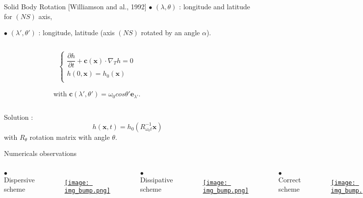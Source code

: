 \documentclass[11pt]{beamer}
\begin{document}
\begin{frame}{Solid Body Rotation [Williamson and al., 1992]}
$\bullet$ $(\lambda, \theta)$ : longitude and latitude for $(NS)$ axis,

$\bullet$ $(\lambda', \theta')$ : longitude, latitude (axis $(NS)$ rotated by an angle $\alpha$).

\begin{columns}
\begin{figure}
\def\svgwidth{0.6 \textwidth}
\vspace{0.5cm}

\end{figure}
\begin{block}{}
\begin{equation*}
\left \{
\begin{array}{l}
\dfrac{\partial h}{\partial t} + \mathbf{c} \left( \mathbf{x} \right) \cdot \nabla_T h = 0\\[6pt]
h(0,\mathbf{x}) = h_0(\mathbf{x})\\
\end{array}
\right.
\end{equation*}

with $\mathbf{c} \left( \lambda', \theta' \right) = \omega_0  cos \theta' \mathbf{e}_{\lambda'}$.
\end{block}
\end{columns}

\begin{block}{}
Solution :
$$h \left( \mathbf{x} , t \right) = h_0 \left( R_{\omega_0 t}^{-1} \mathbf{x} \right)$$
with $R_{\theta}$ rotation matrix with angle $\theta$.

\end{block}
\end{frame}


\begin{frame}{Numericals observations}
\begin{columns}
$\bullet$ Dispersive scheme
\begin{figure}
\href{run:ref_7363895058_test_0.avi}{\texttt{[image: img\_bump.png]}} 
\end{figure}

$\bullet$ Dissipative scheme
\begin{figure}
\href{run:ref_7363895782_test_0.avi}{\texttt{[image: img\_bump.png]}} 
\end{figure}

$\bullet$ Correct scheme
\begin{figure}
\href{run:ref_7363896161_test_0.avi}{\texttt{[image: img\_bump.png]}} 
\end{figure}
\end{columns}
\end{frame}
\end{document}
